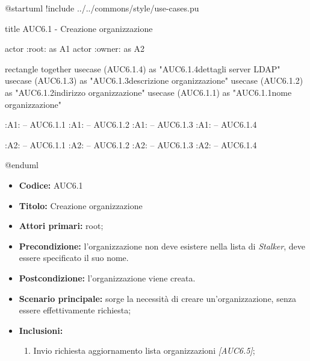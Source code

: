 \documentclass[casi-duso]{subfiles}
\begin{document}
  \begin{plantuml}
  @startuml
  !include ../../commons/style/use-cases.pu

  title AUC6.1 - Creazione organizzazione

  actor :root: as A1
  actor :owner: as A2


  rectangle {
    together {
      usecase (AUC6.1.4) as "AUC6.1.4\nConfigurazione dettagli server LDAP"
      usecase (AUC6.1.3) as "AUC6.1.3\nInserisci descrizione organizzazione"
      usecase (AUC6.1.2) as "AUC6.1.2\nInserisci indirizzo organizzazione"
      usecase (AUC6.1.1) as "AUC6.1.1\nInserisci nome organizzazione"
    }
  }

  :A1: -- AUC6.1.1
  :A1: -- AUC6.1.2
  :A1: -- AUC6.1.3
  :A1: -- AUC6.1.4

  :A2: -- AUC6.1.1
  :A2: -- AUC6.1.2
  :A2: -- AUC6.1.3
  :A2: -- AUC6.1.4

  @enduml
  \end{plantuml}

  \begin{itemize}
    \item \textbf{Codice:} AUC6.1
    \item \textbf{Titolo:} Creazione organizzazione
    \item \textbf{Attori primari:} root;
    \item \textbf{Precondizione:} l'organizzazione non deve esistere nella lista di \emph{Stalker}, deve essere specificato il suo nome.
    \item \textbf{Postcondizione:} l'organizzazione viene creata.
    \item \textbf{Scenario principale:} sorge la necessità di creare un'organizzazione, senza essere effettivamente richiesta;
    \item \textbf{Inclusioni:}
    \begin{enumerate}
      \item Invio richiesta aggiornamento lista organizzazioni \emph{[AUC6.5]};
    \end{enumerate}
  \end{itemize}
\end{document}
